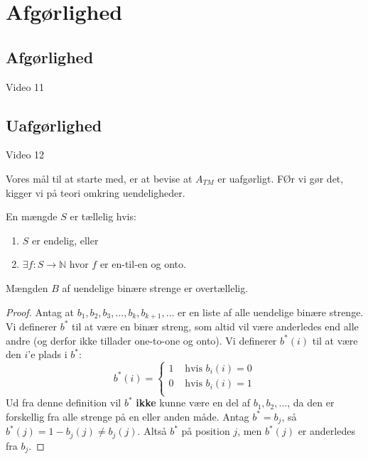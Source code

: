 \chapter{Afgørlighed}

\section{Afgørlighed}%
\label{sec:afgørlighed}

\begin{note}[Kilder]
	Video 11
\end{note}



\section{Uafgørlighed}%
\label{sec:label}

\begin{note}[Kilder]
	Video 12
\end{note}

Vores mål til at starte med, er at bevise at $A_{TM}$ er uafgørligt. FØr vi gør det, kigger vi på teori omkring uendeligheder.

\begin{definition}
	En mængde $S$ er tællelig hvis:
	\begin{enumerate}
		\item $S$ er endelig, eller
		\item $\exists f : S \rightarrow \mathbb{N}$ hvor $f$ er en-til-en og onto.
	\end{enumerate}
\end{definition}

\begin{theorem}
	Mængden $B$ af uendelige binære strenge er overtællelig.
\end{theorem}

\begin{proof}
	Antag at $b_{1}, b_{2}, b_{3}, \ldots, b_{k}, b_{k+1}, \ldots$ er en liste af alle uendelige binære strenge.
	Vi definerer $b^{*}$ til at være en binær streng, som altid vil være anderledes end alle andre (og derfor ikke tillader one-to-one og onto). Vi definerer $b^{*}(i)$ til at være den $i$'e plads i $b^{*}$:
	\begin{equation}
		b^{*}(i) = \begin{cases}
			1 & \text{ hvis } b_{i}(i) = 0 \\
			0 & \text{ hvis } b_{i}(i) = 1 \\
		\end{cases}
	\end{equation}
	Ud fra denne definition vil $b^{*}$ \textbf{ikke} kunne være en del af $b_{1}, b_{2}, \ldots$, da den er forskellig fra alle strenge på en eller anden måde. Antag $b^{*} = b_{j}$, så $b^{*}(j) = 1 - b_{j}(j) \ne b_{j}(j)$. Altså $b^{*}$ på position $j$, men $b^{*}(j)$ er anderledes fra $b_{j}$.
\end{proof}

